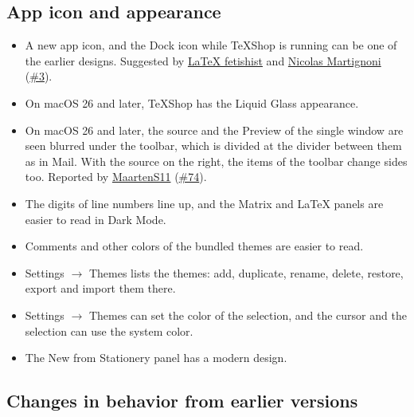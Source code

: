 \documentclass[11pt,letterpaper]{article}
\begin{document}
\subsection{App icon and appearance}

\begin{itemize}
\item A new app icon, and the Dock icon while TeXShop is running can be one of the earlier designs. Suggested by \href{https://github.com/LaTeX-fetishist}{LaTeX fetishist} and \href{https://github.com/martignoni}{Nicolas Martignoni} (\href{https://github.com/TeXShopProject/TeXShop/issues/3}{\#3}).
\item On macOS 26 and later, TeXShop has the Liquid Glass appearance.
\item On macOS 26 and later, the source and the Preview of the single window are seen blurred under the toolbar, which is divided at the divider between them as in Mail. With the source on the right, the items of the toolbar change sides too. Reported by \href{https://github.com/MaartenS11}{MaartenS11} (\href{https://github.com/TeXShopProject/TeXShop/issues/74}{\#74}).
\item The digits of line numbers line up, and the Matrix and LaTeX panels are easier to read in Dark Mode.
\item Comments and other colors of the bundled themes are easier to read.
\item Settings \(\rightarrow\) Themes lists the themes: add, duplicate, rename, delete, restore, export and import them there.
\item Settings \(\rightarrow\) Themes can set the color of the selection, and the cursor and the selection can use the system color.
\item The New from Stationery panel has a modern design.
\end{itemize}

\subsection{Changes in behavior from earlier versions}
\end{document}
